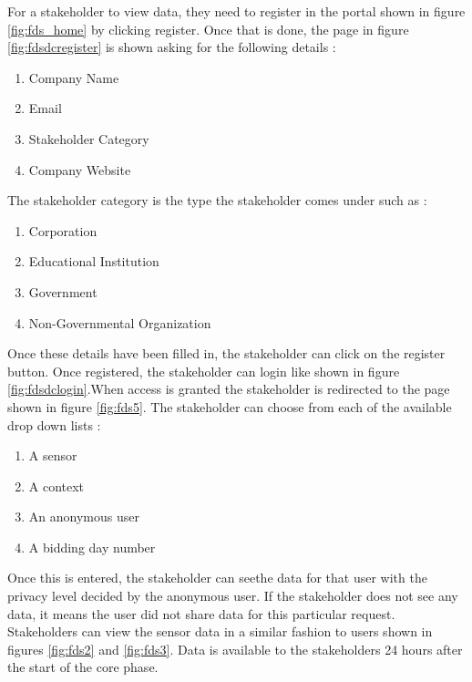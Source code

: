 For a stakeholder to view data, they need to register in the portal shown in figure \ref{fig:fds_home} by clicking register. Once that is done,
the page in figure \ref{fig:fdsdcregister} is shown asking for the following details :

\begin{enumerate}
    \item Company Name
    \item Email
    \item Stakeholder Category
    \item Company Website
\end{enumerate}

The stakeholder category is the type the stakeholder comes under such as :

\begin{enumerate}
    \item Corporation
    \item Educational Institution
    \item Government
    \item Non-Governmental Organization
\end{enumerate}


Once these details have been filled in, the stakeholder can click on the register button. Once registered, the stakeholder can login like shown in figure \ref{fig:fdsdclogin}.When access is granted the stakeholder is redirected to the page shown in figure \ref{fig:fds5}. The stakeholder can choose from each of the available drop down lists :
\begin{enumerate}
    \item A sensor
    \item A context
    \item An anonymous user
    \item A bidding day number
\end{enumerate}

Once this is entered, the stakeholder can seethe  data for that user with the privacy level decided by the anonymous user. If the stakeholder does not see any data, it means the user did not share data for this particular request. Stakeholders can view the sensor data in a similar fashion to users shown in figures \ref{fig:fds2} and \ref{fig:fds3}. Data is available to the stakeholders 24 hours after the start of the core phase.


